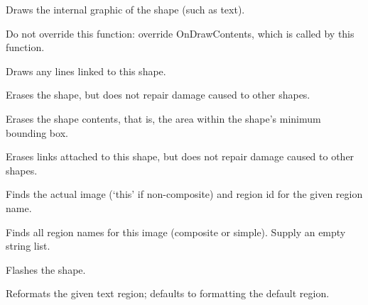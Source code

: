 

Draws the internal graphic of the shape (such as
text).

Do not override this function: override OnDrawContents, which is called
by this function.



Draws any lines linked to this shape.



Erases the shape, but does not repair damage caused to other
shapes.



Erases the shape contents, that is, the area within the shape's
minimum bounding box.



Erases links attached to this shape, but does not repair
damage caused to other shapes.



Finds the actual image (`this' if non-composite) and region id for the given
region name.



Finds all region names for this image (composite or simple).
Supply an empty string list.



Flashes the shape.



Reformats the given text region; defaults to formatting the default region.

